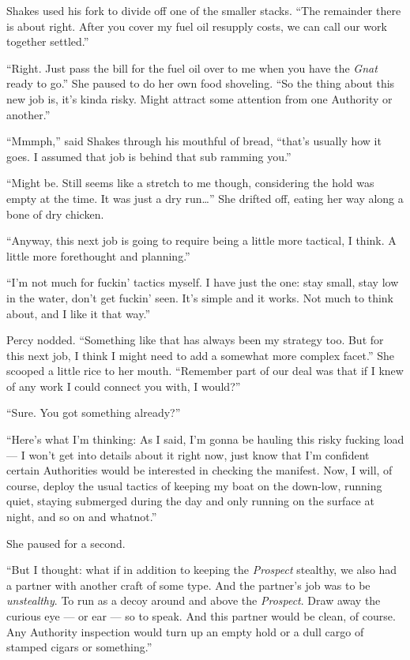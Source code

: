 \documentclass[
]{scrbook}
\begin{document}
Shakes used his fork to divide off one of the smaller stacks. ``The
remainder there is about right. After you cover my fuel oil resupply
costs, we can call our work together settled.''

``Right. Just pass the bill for the fuel oil over to me when you have
the \emph{Gnat} ready to go.'' She paused to do her own food shoveling.
``So the thing about this new job is, it's kinda risky. Might attract
some attention from one Authority or another.''

``Mmmph,'' said Shakes through his mouthful of bread, ``that's usually
how it goes. I assumed that job is behind that sub ramming you.''

``Might be. Still seems like a stretch to me though, considering the
hold was empty at the time. It was just a dry run\ldots{}'' She drifted
off, eating her way along a bone of dry chicken.

``Anyway, this next job is going to require being a little more
tactical, I think. A little more forethought and planning.''

``I'm not much for fuckin' tactics myself. I have just the one: stay
small, stay low in the water, don't get fuckin' seen. It's simple and it
works. Not much to think about, and I like it that way.''

Percy nodded. ``Something like that has always been my strategy too. But
for this next job, I think I might need to add a somewhat more complex
facet.'' She scooped a little rice to her mouth. ``Remember part of our
deal was that if I knew of any work I could connect you with, I would?''

``Sure. You got something already?''

``Here's what I'm thinking: As I said, I'm gonna be hauling this risky
fucking load --- I won't get into details about it right now, just know
that I'm confident certain Authorities would be interested in checking
the manifest. Now, I will, of course, deploy the usual tactics of
keeping my boat on the down-low, running quiet, staying submerged during
the day and only running on the surface at night, and so on and
whatnot.''

She paused for a second.

``But I thought: what if in addition to keeping the \emph{Prospect}
stealthy, we also had a partner with another craft of some type. And the
partner's job was to be \emph{unstealthy}. To run as a decoy around and
above the \emph{Prospect}. Draw away the curious eye --- or ear --- so
to speak. And this partner would be clean, of course. Any Authority
inspection would turn up an empty hold or a dull cargo of stamped cigars
or something.''
\end{document}
